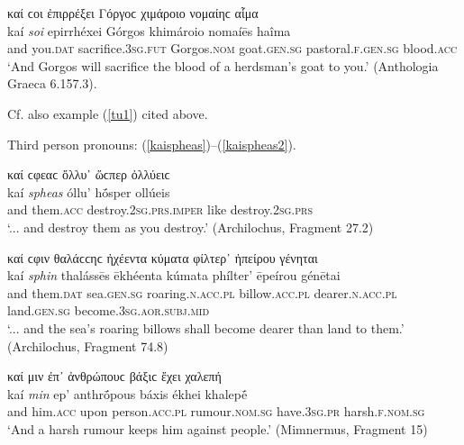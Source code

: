 \begin{exe}
\ex καί ϲοι ἐπιρρέξει Γόργοϲ χιμάροιο νομαίηϲ αἷμα\\
\gll kaí \emph{soi} epirrhéxei Górgos khimároio nomaíēs haîma\\
and you.\textsc{dat} sacrifice.\textsc{3sg.fut} Gorgos.\textsc{nom}
goat.\textsc{gen.sg} pastoral.\textsc{f.gen.sg} blood.\textsc{acc}\\
\trans `And Gorgos will sacrifice the blood of a herdsman's goat to you.' (Anthologia Graeca 6.157.3).
\label{kaisoi3}
\end{exe}

Cf. also example (\ref{tu1}) cited above.

Third person pronouns: (\ref{kaispheas})--(\ref{kaispheas2}).

\begin{exe}
\ex καί ϲφεαϲ ὄλλυ᾽ ὥϲπερ ὀλλύειϲ\\
\gll kaí \emph{spheas} óllu' hṓsper ollúeis\\
and them.\textsc{acc} destroy.\textsc{2sg.prs.imper} like
destroy.\textsc{2sg.prs}\\
\trans `... and destroy them as you destroy.' (Archilochus, Fragment 27.2)
\label{kaispheas}
\end{exe}

\begin{exe}
\ex καί ϲφιν θαλάϲϲηϲ ἠχέεντα κύματα φίλτερ᾽ ἠπείρου γένηται\\
\gll kaí \emph{sphin} thalássēs ēkhéenta kúmata phílter' ēpeírou génētai\\
and them.\textsc{dat} sea.\textsc{gen.sg} roaring.\textsc{n.acc.pl} billow.\textsc{acc.pl} dearer.\textsc{n.acc.pl} land.\textsc{gen.sg} become.\textsc{3sg.aor.subj.mid}\\
\trans `... and the sea's roaring billows shall become dearer than land to them.' (Archilochus, Fragment 74.8)
\label{kaisphin1}
\end{exe}

\begin{exe}
\ex καί μιν ἐπ᾽ ἀνθρώπουϲ βάξιϲ ἔχει χαλεπή\\
\gll kaí \emph{min} ep' anthrṓpous báxis ékhei khalepḗ\\
and him.\textsc{acc} upon person.\textsc{acc.pl} rumour.\textsc{nom.sg}
have.\textsc{3sg.pr} harsh.\textsc{f.nom.sg}\\
\trans `And a harsh rumour keeps him against people.' (Mimnermus, Fragment 15)
\label{kaimin1}
\end{exe}

